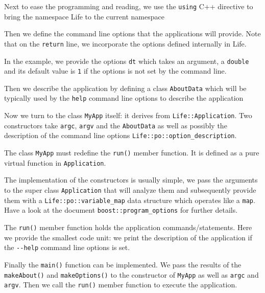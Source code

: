 \documentclass[11pt]{article}
\newcommand{\cpp}{C{\hspace{-.3em}\vspace{-.2em}\tiny++}\xspace}
\begin{document}


Next to ease the programming and reading, we use the \lstinline!using!
\cpp directive to bring the namespace Life to the current namespace



Then we define the command line options that the applications will
provide. Note that on the \lstinline!return! line, we incorporate the
options defined internally in Life.



In the example, we provide the options \lstinline!dt! which takes an
argument, a \lstinline!double! and its default value is \lstinline!1!
if the options is not set by the command line.

Then we describe the application by defining a class
\lstinline!AboutData! which will be typically used by the
\lstinline!help! command line options to describe the application





Now we turn to the class \lstinline!MyApp! itself: it derives from
\lstinline!Life::Application!. Two constructors take \lstinline!argc!,
\lstinline!argv! and the \lstinline!AboutData! as well as possibly the
description of the command line options \lstinline!Life::po::option_description!.

The class \lstinline!MyApp! must redefine the \lstinline!run()! member
function. It is defined as a pure virtual function in
\lstinline!Application!.




The implementation of the constructors is usually simple, we pass the
arguments to the super class \lstinline!Application! that will analyze
them and subsequently provide them with a
\lstinline!Life::po::variable_map! data structure which operates like
a \lstinline!map!. Have a look at the document
\lstinline!boost::program_options! for further details.



The \lstinline!run()! member function holds the application
commands/statements. Here we provide the smallest code unit: we print
the description of the application if the \lstinline!--help! command
line options is set.


Finally the \lstinline!main()! function can be implemented. We pass
the results of the \lstinline!makeAbout()! and
\lstinline!makeOptions()! to the constructor of \lstinline!MyApp! as
well as \lstinline!argc! and \lstinline!argv!. Then we call the
\lstinline!run()! member function to execute the application.
\end{document}
